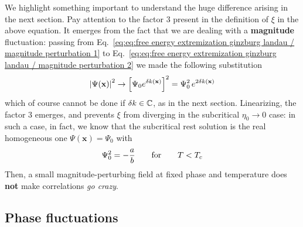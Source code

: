 We highlight something important to understand the huge difference arising in the next section. Pay attention to the factor $3$ present in the definition of $\xi$ in the above equation. It emerges from the fact that we are dealing with a \textbf{magnitude} fluctuation: passing from Eq.~\eqref{eq:eq:free energy extremization ginzburg landau / magnitude perturbation 1} to Eq.~\eqref{eq:eq:free energy extremization ginzburg landau / magnitude perturbation 2} we made the following substitution
\[  
    \abs{\Psi(\mathbf{x})}^2 \to \left[{ \Psi_0 e^{\delta k(\mathbf{x})} }\right]^2 = \Psi_0^2 \, e^{2 \delta k(\mathbf{x})}
\]
which of course cannot be done if $\delta k \in \mathbb{C}$, as in the next section. Linearizing, the factor $3$ emerges, and prevents $\xi$ from diverging in the subcritical $\eta_0 \to 0$ case: in such a case, in fact, we know that the subcritical rest solution is the real homogeneous one $\Psi(\mathbf{x}) = \Psi_0$ with
\[
    \Psi_0^2 = - \frac{a}{b}
    \quad\qq{for}\quad
    T < T_c
\]
Then, a small magnitude-perturbing field at fixed phase and temperature does \textbf{not} make correlations \textit{go crazy}.

\subsection{Phase fluctuations}


